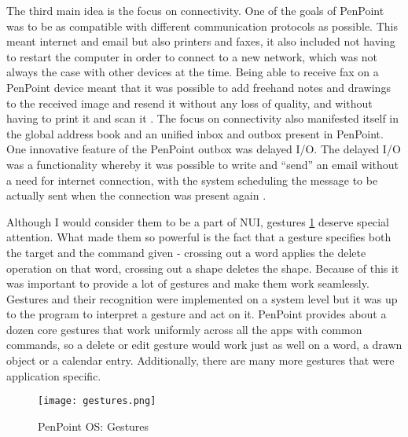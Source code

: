 The third main idea is the focus on connectivity. One of the goals of PenPoint
was to be as compatible with different communication protocols as possible.
This meant internet and email but also printers and faxes, it also included not
having to restart the computer in order to connect to a new network, which was
not always the case with other devices at the time. Being able to receive fax
on a PenPoint device meant that it was possible to add freehand notes and
drawings to the received image and resend it without any loss of quality, and
without having to print it and scan it \cite{godemo1991}. The focus on
connectivity also manifested itself in the global address book and an unified
inbox and outbox present in PenPoint. One innovative feature of the PenPoint
outbox was delayed I/O. The delayed I/O was a functionality whereby it was
possible to write and ``send'' an email without a need for internet connection,
with the system scheduling the message to be actually sent when the connection
was present again \cite{carr1991} \cite{brown1993}.

Although I would consider them to be a part of NUI, gestures \ref{fig:gestures}
deserve special attention. What made them so powerful is the fact that
a gesture specifies both the target and the command given - crossing out a word
applies the delete operation on that word, crossing out a shape deletes the
shape. Because of this it was important to provide a lot of gestures and make
them work seamlessly. Gestures and their recognition were implemented on
a system level but it was up to the program to interpret a gesture and act on
it. PenPoint provides about a dozen core gestures that work uniformly across
all the apps with common commands, so a delete or edit gesture would work just
as well on a word, a drawn object or a calendar entry.  Additionally, there are
many more gestures that were application specific.

\begin{figure}[!h]
    \centering \texttt{[image: gestures.png]}
    \caption{PenPoint OS: Gestures}
    \label{fig:gestures}
\end{figure}

